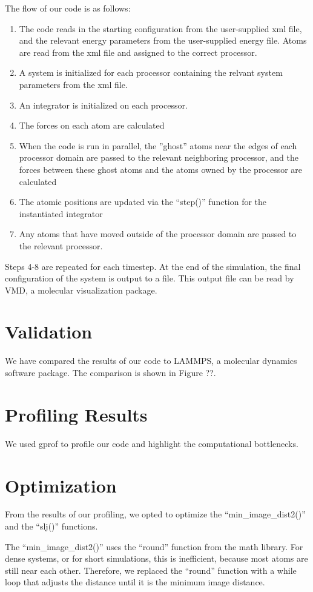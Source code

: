 \documentclass[10pt]{article}
\begin{document}
The flow of our code is as follows:
\begin{enumerate}
\item The code reads in the starting configuration from the user-supplied xml file, and the relevant energy parameters from the user-supplied energy file. Atoms are read from the xml file and assigned to the correct processor. 
\item A system is initialized for each processor containing the relvant system parameters from the xml file.
\item An integrator is initialized on each processor. 
\item The forces on each atom are calculated
\item When the code is run in parallel, the ''ghost'' atoms near the edges of each processor domain are passed to the relevant neighboring processor, and the forces between these ghost atoms and the atoms owned by the processor are calculated
\item The atomic positions are updated via the ``step()'' function for the instantiated integrator
\item Any atoms that have moved outside of the processor domain are passed to the relevant processor.
\end{enumerate}
Steps 4-8 are repeated for each timestep. 
%
At the end of the simulation, the final configuration of the system is output to a file.
%
This output file can be read by VMD, a molecular visualization package.

\section{Validation}
We have compared the results of our code to LAMMPS, a molecular dynamics software package.
%
The comparison is shown in Figure ??.

\section{Profiling Results}
We used gprof to profile our code and highlight the computational bottlenecks.


\section{Optimization}
From the results of our profiling, we opted to optimize the ``min\_image\_dist2()'' and the ``slj()'' functions.

The ``min\_image\_dist2()'' uses the ``round'' function from the math library. 
%
For dense systems, or for short simulations, this is inefficient, because most atoms are still near each other.
%
Therefore, we replaced the ``round'' function with a while loop that adjusts the distance until it is the minimum image distance.
\end{document}
